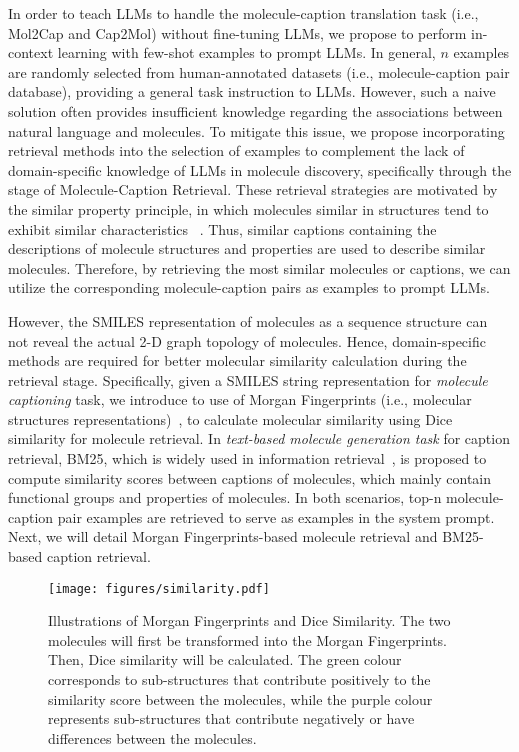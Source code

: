 \documentclass{article}
\theoremstyle{plain}
\theoremstyle{definition}
\theoremstyle{remark}
\begin{document}
In order to teach LLMs to handle the molecule-caption translation task (i.e., Mol2Cap and Cap2Mol) without fine-tuning LLMs, we propose to perform in-context learning with few-shot examples to prompt LLMs.
In general, $n$ examples are randomly selected from human-annotated datasets (i.e., molecule-caption pair database), providing a general task instruction to LLMs. 
However, such a naive solution often provides insufficient knowledge regarding the associations between natural language and molecules.
To mitigate this issue, we propose incorporating retrieval methods into the selection of examples to complement the lack of domain-specific knowledge of LLMs in molecule discovery, specifically through the stage of Molecule-Caption Retrieval.
These retrieval strategies are motivated by the similar property principle, in which molecules similar in structures tend to exhibit similar characteristics ~\cite{wang2016improving}.
Thus, similar captions containing the descriptions of molecule structures and properties are used to describe similar molecules.
Therefore, by retrieving the most similar molecules or captions, we can utilize the corresponding molecule-caption pairs as examples to prompt LLMs. 


However, the SMILES representation of molecules as a sequence structure can not reveal the actual 2-D graph topology of molecules. Hence, domain-specific methods are required for better molecular similarity calculation during the retrieval stage.
Specifically, given a SMILES string representation for \emph{molecule captioning} task, we introduce to use of Morgan Fingerprints (i.e., molecular structures representations)~\cite{butina1999unsupervised}, to calculate molecular similarity using Dice similarity for molecule retrieval.
In \emph{text-based molecule generation task} for caption retrieval, BM25, which is widely used in information retrieval~\cite{robertson2009probabilistic}, is proposed to compute similarity scores between captions of molecules, which mainly contain functional groups and properties of molecules. 
In both scenarios, top-n molecule-caption pair examples are retrieved to serve as examples in the system prompt.
Next, we will detail Morgan Fingerprints-based molecule retrieval and BM25-based caption retrieval.



\begin{figure}[t]
    \centering
    \texttt{[image: figures/similarity.pdf]}
    \caption{Illustrations of Morgan Fingerprints and Dice Similarity. 
    The two molecules will first be transformed into the Morgan Fingerprints. Then, Dice similarity will be calculated.
    The green colour corresponds to sub-structures that contribute positively to the similarity score between the molecules, 
    while the purple colour represents sub-structures that contribute negatively or have differences between the molecules. 
    }
    \label{fig:similarity}
\end{figure}
\end{document}

